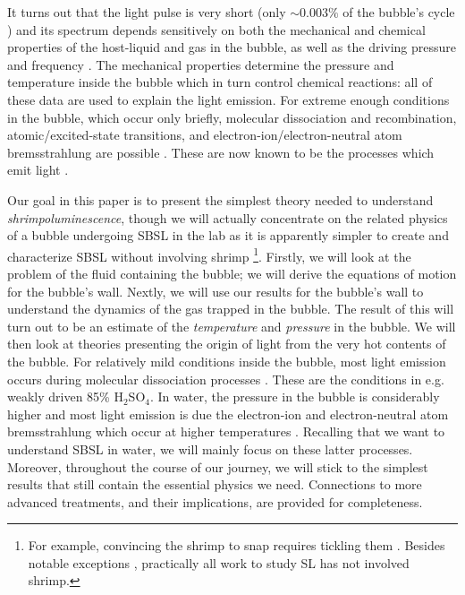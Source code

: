 \documentclass[rmp,aps,nofootinbib,superscriptaddress,floatfix]{revtex4-2}
\begin{document}
It turns out that the light pulse is very short (only $\sim0.003\%$ of the bubble's cycle \cite{suslick2008inside}) and its spectrum depends sensitively on both the mechanical and chemical properties of the host-liquid and gas in the bubble, as well as the driving pressure and frequency \cite{brenner2002single,suslick2008inside}. The mechanical properties determine the pressure and temperature inside the bubble which in turn control chemical reactions: all of these data are used to explain the light emission. For extreme enough conditions in the bubble, which occur only briefly, molecular dissociation and recombination, atomic/excited-state transitions, and electron-ion/electron-neutral atom bremsstrahlung are possible \cite{an2009diagnosing,an2008spectral,an2006mechanism,flannigan2005plasma,suslick2008inside,flannigan2006measurement}. These are now known to be the processes which emit light \cite{lohse2018bubble,yasui2018acoustic}.

Our goal in this paper is to present the simplest theory needed to understand \emph{shrimpoluminescence}, though we will actually concentrate on the related physics of a bubble undergoing SBSL in the lab as it is apparently simpler to create and characterize SBSL without involving shrimp \footnote{ For example, convincing the shrimp to snap requires tickling them \cite{lohse2001snapping,versluis2000snapping,lohse2018bubble}. Besides notable exceptions \cite{tang2019bioinspired}, practically all work to study SL has not involved shrimp.}. Firstly, we will look at the problem of the fluid containing the bubble; we will derive the equations of motion for the bubble's wall. Nextly, we will use our results for the bubble's wall to understand the dynamics of the gas trapped in the bubble. The result of this will turn out to be an estimate of the \emph{temperature} and \emph{pressure} in the bubble. We will then look at theories presenting the origin of light from the very hot contents of the bubble. For relatively mild conditions inside the bubble, most light emission occurs during molecular dissociation processes \cite{}. These are the conditions in e.g. weakly driven 85\% H$_2$SO$_4$. In water, the pressure in the bubble is considerably higher and most light emission is due the electron-ion and electron-neutral atom bremsstrahlung which occur at higher temperatures \cite{flannigan2005plasma,an2009diagnosing,suslick2008inside}. Recalling that we want to understand SBSL in water, we will mainly focus on these latter processes. Moreover, throughout the course of our journey, we will stick to the simplest results that still contain the essential physics we need. Connections to more advanced treatments, and their implications, are provided for completeness.
\end{document}
